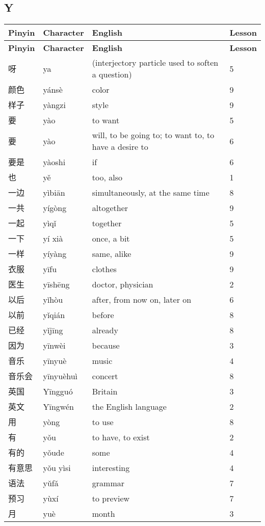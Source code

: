 \documentclass[12pt]{article}
\newcommand{\vocabitem}[4]{%
  #1 & #2 & #3 & #4 \\ \midrule
}
\begin{document}
\subsection*{Y}
\begin{longtable}{P{\dimexpr\textwidth/4\relax}P{\dimexpr\textwidth/4\relax}P{\dimexpr\textwidth/4\relax}P{\dimexpr\textwidth/4\relax}}
\toprule
\textbf{Pinyin} & \textbf{Character} & \textbf{English} & \textbf{Lesson} \\
\midrule
\endfirsthead
\toprule
\textbf{Pinyin} & \textbf{Character} & \textbf{English} & \textbf{Lesson} \\
\midrule
\endhead
\vocabitem{呀}{ya}{(interjectory particle used to soften a question)}{5}
\vocabitem{颜色}{yánsè}{color}{9}
\vocabitem{样子}{yàngzi}{style}{9}
\vocabitem{要}{yào}{to want}{5}
\vocabitem{要}{yào}{will, to be going to; to want to, to have a desire to}{6}
\vocabitem{要是}{yàoshi}{if}{6}
\vocabitem{也}{yě}{too, also}{1}
\vocabitem{一边}{yìbiān}{simultaneously, at the same time}{8}
\vocabitem{一共}{yígòng}{altogether}{9}
\vocabitem{一起}{yìqǐ}{together}{5}
\vocabitem{一下}{yí xià}{once, a bit}{5}
\vocabitem{一样}{yíyàng}{same, alike}{9}
\vocabitem{衣服}{yīfu}{clothes}{9}
\vocabitem{医生}{yīshēng}{doctor, physician}{2}
\vocabitem{以后}{yǐhòu}{after, from now on, later on}{6}
\vocabitem{以前}{yǐqián}{before}{8}
\vocabitem{已经}{yǐjīng}{already}{8}
\vocabitem{因为}{yīnwèi}{because}{3}
\vocabitem{音乐}{yīnyuè}{music}{4}
\vocabitem{音乐会}{yīnyuèhuì}{concert}{8}
\vocabitem{英国}{Yīngguó}{Britain}{3}
\vocabitem{英文}{Yīngwén}{the English language}{2}
\vocabitem{用}{yòng}{to use}{8}
\vocabitem{有}{yǒu}{to have, to exist}{2}
\vocabitem{有的}{yǒude}{some}{4}
\vocabitem{有意思}{yǒu yìsi}{interesting}{4}
\vocabitem{语法}{yǔfǎ}{grammar}{7}
\vocabitem{预习}{yùxí}{to preview}{7}
\vocabitem{月}{yuè}{month}{3}
\end{longtable}
\end{document}
